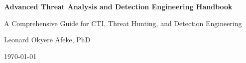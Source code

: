 \documentclass[12pt]{report}
\begin{document}
\setlength{\parindent}{0pt}
\setlength{\parskip}{8pt}

\begin{titlepage}
    \centering
    \vspace*{2cm}

    {\Huge \textbf{Advanced Threat Analysis and Detection Engineering Handbook}}\

\vspace{0.5cm}

    {\Large A Comprehensive Guide for CTI, Threat Hunting, and Detection Engineering}\

\vspace{2cm}

    {\large Leonard Okyere Afeke, PhD}\

\vspace{2cm}

    \vfill
    {\large \today}
\end{titlepage}

\tableofcontents
\newpage














\end{document}
